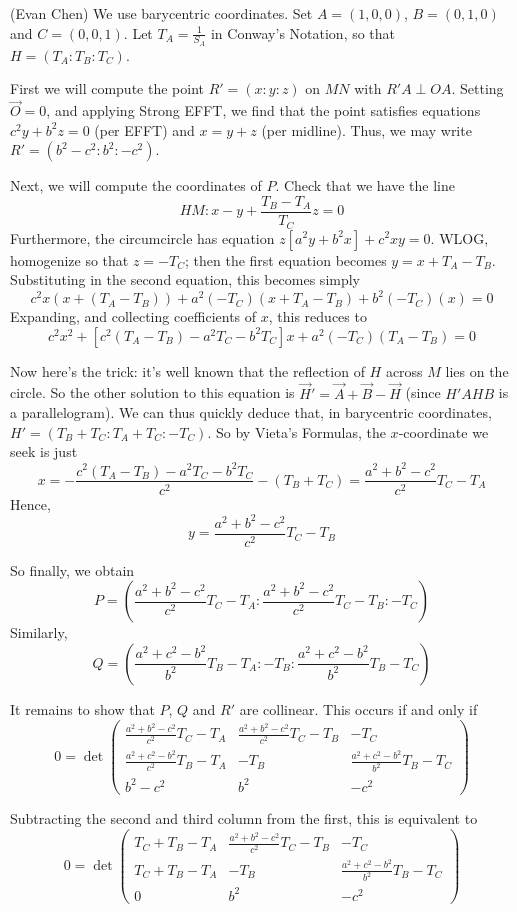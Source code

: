 \begin{soln}
  (Evan Chen) We use barycentric coordinates.  Set $A=(1,0,0)$, $B=(0,1,0)$ and $C=(0,0,1)$.  Let $T_A = \frac{1}{S_A}$ in Conway's Notation, so that $H = (T_A : T_B : T_C)$.

  First we will compute the point $R' = (x:y:z)$ on $MN$ with $R'A \perp OA$.  Setting $\vec O = 0$, and applying Strong EFFT, we find that the point satisfies equations $c^2y+b^2z=0$ (per EFFT) and $x=y+z$ (per midline).  Thus, we may write $\boxed{R' = (b^2-c^2:b^2:-c^2)}$.

  Next, we will compute the coordinates of $P$.  Check that we have the line \[ HM: x-y + \frac{T_B - T_A}{T_C} z = 0 \] Furthermore, the circumcircle has equation $z[a^2y+b^2x] + c^2xy = 0$.  WLOG, homogenize so that $z=-T_C$; then the first equation becomes $y = x + T_A - T_B$.  Substituting in the second equation, this becomes simply
  \[ c^2x(x+(T_A-T_B)) + a^2(-T_C)(x+T_A-T_B) + b^2(-T_C)(x) = 0 \]
  Expanding, and collecting coefficients of $x$, this reduces to
  \[ c^2x^2 + [c^2(T_A-T_B)-a^2T_C-b^2T_C] x + a^2(-T_C)(T_A-T_B) = 0 \]

  Now here's the trick: it's well known that the reflection of $H$ across $M$ lies on the circle.  So the other solution to this equation is $\vec H' = \vec A + \vec B - \vec H$ (since $H'AHB$ is a parallelogram).  We can thus quickly deduce that, in barycentric coordinates, $H'=(T_B+T_C : T_A+T_C : -T_C)$.  So by Vieta's Formulas, the $x$-coordinate we seek is just
  \[ x = -\frac{c^2(T_A-T_B)-a^2T_C-b^2T_C}{c^2} - (T_B+T_C) = \frac{a^2+b^2-c^2}{c^2} T_C - T_A \]
  Hence, \[ y = \frac{a^2+b^2-c^2}{c^2} T_C - T_B \]

  So finally, we obtain \[ \boxed{P = \left( \frac{a^2+b^2-c^2}{c^2} T_C - T_A : \frac{a^2+b^2-c^2}{c^2}T_C - T_B : -T_C \right)} \] Similarly, \[ \boxed{Q = \left( \frac{a^2+c^2-b^2}{b^2} T_B - T_A : -T_B : \frac{a^2+c^2-b^2}{b^2}T_B - T_C \right) } \]

  It remains to show that $P$, $Q$ and $R'$ are collinear.  This occurs if and only if
  \[ 0 = \det \left( \begin{array}{ccc}
  \frac{a^2+b^2-c^2}{c^2} T_C - T_A & \frac{a^2+b^2-c^2}{c^2}T_C - T_B & -T_C \\
  \frac{a^2+c^2-b^2}{c^2} T_B - T_A & -T_B & \frac{a^2+c^2-b^2}{b^2}T_B - T_C  \\
  b^2-c^2 & b^2 & -c^2 \end{array} \right) \]

  Subtracting the second and third column from the first, this is equivalent to
  \[ 0 = \det \left( \begin{array}{ccc}
  T_C + T_B - T_A & \frac{a^2+b^2-c^2}{c^2}T_C - T_B & -T_C \\
  T_C + T_B - T_A & -T_B & \frac{a^2+c^2-b^2}{b^2}T_B - T_C  \\
  0 & b^2 & -c^2 \end{array} \right) \]


\end{soln}
